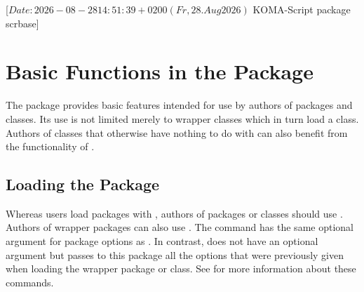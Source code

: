 %
%
%
%
%
%
%

                 [$Date: 2026-08-28 14:51:39 +0200 (Fr, 28. Aug 2026) $
                  KOMA-Script package scrbase]

\chapter{Basic Functions in the  Package}
\BeginIndexGroup
{}%

The  package provides basic features intended for use by
authors of packages and classes. Its use is not limited merely to wrapper
classes which in turn load a \KOMAScript{} class. Authors of classes that
otherwise have nothing to do with \KOMAScript{} can also benefit from the
functionality of .

\section{Loading the Package}

Whereas users load packages with , authors of packages or
classes should use . Authors of
wrapper packages can also use . The
 command has the same optional argument for package
options as . In contrast, 
does not have an optional argument but passes to this package all the options
that were previously given when loading the wrapper package or class. See
\cite{latex:clsguide} for more information about these commands.

